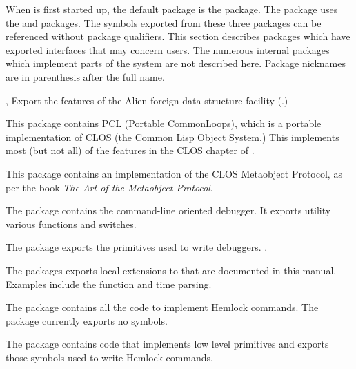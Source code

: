 When \cmucl{} is first started up, the default package is the
 package. The  package
uses the  and  packages. The
symbols exported from these three packages can be referenced without
package qualifiers. This section describes packages which have
exported interfaces that may concern users. The numerous internal
packages which implement parts of the system are not described here.
Package nicknames are in parenthesis after the full name.

\begin{Lentry}
\item[\code{alien}, \code{c-call}] Export the features of the Alien
  foreign data structure facility (.)
  
\item[\code{pcl}] This package contains PCL (Portable CommonLoops),
  which is a portable implementation of CLOS (the Common Lisp Object
  System.)  This implements most (but not all) of the features in the
  CLOS chapter of \cltltwo{}.

\item[\code{clos-mop (mop)}] This package contains an implementation
  of the CLOS Metaobject Protocol, as per the book \textit{The Art of
  the Metaobject Protocol}.
  
\item[\code{debug}] The  package contains the command-line
  oriented debugger.  It exports utility various functions and
  switches.
  
\item[\code{debug-internals}] The  package
  exports the primitives used to write debuggers.
  .
  
\item[\code{extensions (ext)}] The  packages exports
  local extensions to \clisp{} that are documented in this manual.
  Examples include the  function and time parsing.
  
\item[\code{hemlock (ed)}] The  package contains all the
  code to implement Hemlock commands.  The  package
  currently exports no symbols.
  
\item[\code{hemlock-internals (hi)}] The 
  package contains code that implements low level primitives and
  exports those symbols used to write Hemlock commands.
  

\end{Lentry}
